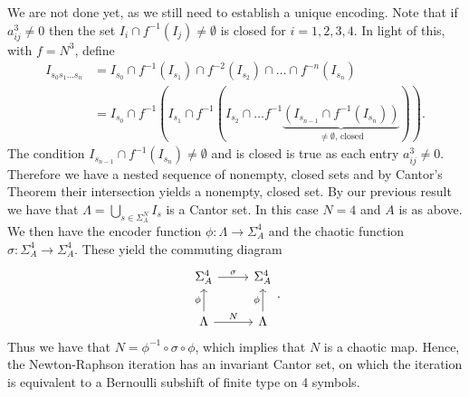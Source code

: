 We are not done yet, as we still need to establish a unique encoding. Note that if $a^{3}_{ij}\neq 0$ then the set $I_{i}\cap f^{-1}(I_j)\neq \emptyset$ is closed for $i=1,2,3,4$. In light of this, with $f=N^3$, define
\begin{subequations}
\begin{align}
	I_{s_0s_1 \ldots s_n} &= I_{s_0} \cap f^{-1}(I_{s_1}) \cap f^{-2}(I_{s_2}) \cap \ldots \cap f^{-n}(I_{s_n}) \\
			      &= I_{s_0} \cap f^{-1}\left(I_{s_1} \cap f^{-1}\left( I_{s_2} \cap \ldots f^{-1}\underbrace{\left(I_{s_{n-1}}\cap f^{-1}(I_{s_n})\right) }_{\neq\emptyset \textrm{, closed} }\right) \right).
\end{align}
\end{subequations}
The condition $I_{s_{n-1}}\cap f^{-1}(I_{s_n})\neq \emptyset$ and is closed is true as each entry $a^{3}_{ij}\neq 0$. Therefore we have a nested sequence of nonempty, closed sets and by Cantor's Theorem their intersection yields a nonempty, closed set. By our previous result we have that $\Lambda= \bigcup_{s\in \Sigma^{N}_{A}}I_{s}$ is a Cantor set. In this case $N=4$ and $A$ is as above. We then have the encoder function $\phi:\Lambda \to \Sigma_{A}^{4}$ and the chaotic function $\sigma:\Sigma_{A}^{4}\to \Sigma_{A}^{4}$. These yield the commuting diagram
\begin{equation}
\begin{tikzcd}
	\Sigma_{A}^{4} \arrow[r, "\sigma"] 
& \Sigma_{A}^{4} \\
\Lambda \arrow[u,"\phi"] \arrow[r, "N"]
& \Lambda \arrow[u, "\phi"] 
\end{tikzcd}.
\end{equation}
Thus we have that $N=\phi^{-1}\circ \sigma \circ \phi$, which implies that $N$ is a chaotic map. Hence, the Newton-Raphson iteration has an invariant Cantor set, on which the iteration is equivalent to a Bernoulli subshift of finite type on 4 symbols.
